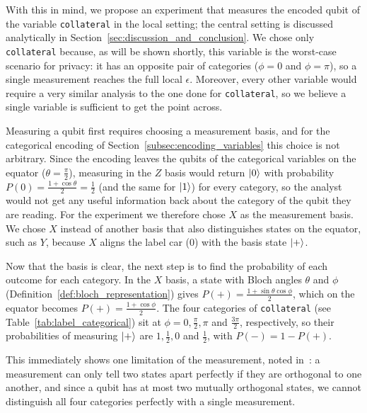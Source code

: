\documentclass{ieeeaccess}
\begin{document}
With this in mind, we propose an experiment that measures the encoded qubit of the variable \texttt{collateral} in the local setting; the central setting is discussed analytically in Section~\ref{sec:discussion_and_conclusion}. We chose only \texttt{collateral} because, as will be shown shortly, this variable is the worst-case scenario for privacy: it has an opposite pair of categories ($\phi = 0$ and $\phi = \pi$), so a single measurement reaches the full local $\epsilon$. Moreover, every other variable would require a very similar analysis to the one done for \texttt{collateral}, so we believe a single variable is sufficient to get the point across.

Measuring a qubit first requires choosing a measurement basis, and for the categorical encoding of Section~\ref{subsec:encoding_variables} this choice is not arbitrary. Since the encoding leaves the qubits of the categorical variables on the equator ($\theta = \frac{\pi}{2}$), measuring in the $Z$ basis would return $\ket{0}$ with probability $P(0) = \frac{1 + \cos\theta}{2} = \frac{1}{2}$ (and the same for $\ket{1}$) for every category, so the analyst would not get any useful information back about the category of the qubit they are reading. For the experiment we therefore chose $X$ as the measurement basis. We chose $X$ instead of another basis that also distinguishes states on the equator, such as $Y$, because $X$ aligns the label car (0) with the basis state $\ket{+}$.

Now that the basis is clear, the next step is to find the probability of each outcome for each category. In the $X$ basis, a state with Bloch angles $\theta$ and $\phi$ (Definition~\ref{def:bloch_representation}) gives $P(+) = \frac{1 + \sin\theta\cos\phi}{2}$, which on the equator becomes $P(+) = \frac{1 + \cos\phi}{2}$. The four categories of \texttt{collateral} (see Table~\ref{tab:label_categorical}) sit at $\phi = 0, \frac{\pi}{2}, \pi$ and $\frac{3\pi}{2}$, respectively, so their probabilities of measuring $\ket{+}$ are $1, \frac{1}{2}, 0$ and $\frac{1}{2}$, with $P(-) = 1 - P(+)$.

This immediately shows one limitation of the measurement, noted in~\cite{watrous_limitations}: a measurement can only tell two states apart perfectly if they are orthogonal to one another, and since a qubit has at most two mutually orthogonal states, we cannot distinguish all four categories perfectly with a single measurement.
\end{document}

